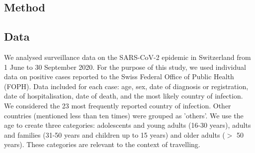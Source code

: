 \documentclass[10pt, a4paper, twoside]{article}
\begin{document}
\begin{multicols}{2}

\section{Method}

\subsection{Data}
We analysed surveillance data on the SARS-CoV-2 epidemic in Switzerland from 1 June to 30 September 2020. 
For the purpose of this study, we used individual data on positive cases reported to the Swiss Federal Office of Public Health (FOPH). 
Data included for each case: age, sex, date of diagnosis or registration, date of hospitalisation, date of death, and the most likely country of infection.
We considered the 23 most frequently reported country of infection.
Other countries (mentioned less than ten times) were grouped as 'others'.
We use the age to create three categories: adolescents and young adults (16-30 years), adults and families (31-50 years and children up to 15 years) and older adults ($>$ 50 years).
These categories are relevant to the context of travelling.


\end{multicols}
\end{document}
